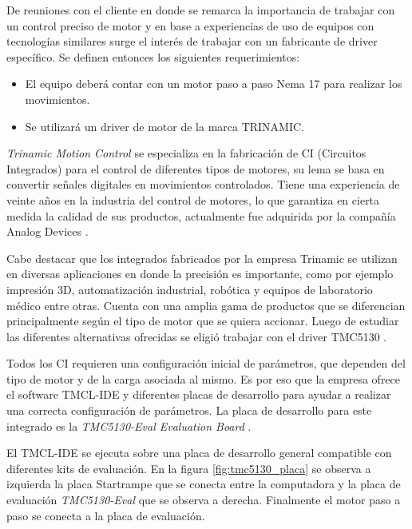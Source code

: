 De reuniones con el cliente en donde se remarca la importancia de trabajar con un control preciso de motor y en base a experiencias de uso de equipos con tecnologías similares surge el interés de trabajar con un fabricante de driver específico. Se definen entonces los siguientes requerimientos:
			
\begin{itemize}
\item El equipo deberá contar con un motor paso a paso Nema 17 \citep{web_nema17}  para realizar los movimientos.
\item Se utilizará un driver de motor de la marca TRINAMIC.
\end{itemize}

\textit{Trinamic Motion Control} \citep{3_web_trinamic} se especializa en la fabricación de CI (Circuitos Integrados) para el control de diferentes tipos de motores, su lema se basa en convertir señales digitales en movimientos controlados. Tiene una experiencia de veinte años en la industria del control de motores, lo que garantiza en cierta medida la calidad de sus productos, actualmente fue adquirida por la compañía Analog Devices \citep{web_analogdevices}.

Cabe destacar que los integrados fabricados por la empresa Trinamic se utilizan en diversas aplicaciones en donde la precisión es importante, como por ejemplo impresión 3D, automatización industrial, robótica y equipos de laboratorio médico entre otras.
Cuenta con una amplia gama de productos que se diferencian principalmente según el tipo de motor que se quiera accionar. Luego de estudiar las diferentes alternativas ofrecidas se eligió trabajar con el driver TMC5130 \citep{3_web_trinamic_producto}.
  
Todos los CI requieren una configuración inicial de parámetros, que dependen del tipo de  motor y de la carga asociada al mismo. Es por eso que la empresa ofrece el software TMCL-IDE  y diferentes placas de desarrollo para ayudar a realizar una correcta configuración de parámetros. La placa de desarrollo para este integrado es la \textit{TMC5130-Eval Evaluation Board} \citep{3_web_trinamic_placa}.

El TMCL-IDE se ejecuta sobre una placa de desarrollo general compatible con diferentes kits de evaluación. En la figura \ref{fig:tmc5130_placa} se observa a izquierda la placa Startrampe  que se conecta entre la computadora y la placa de evaluación \textit{TMC5130-Eval} que se observa a derecha. Finalmente el motor paso a paso se conecta a la placa de evaluación.


